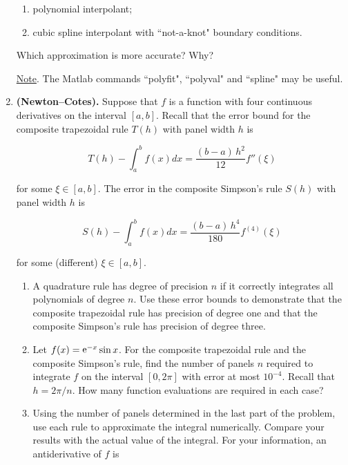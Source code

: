 \documentclass [12pt]{article}
\begin{document}
\begin{enumerate}
\begin{enumerate}
\item polynomial interpolant;

\item cubic spline interpolant with ``not-a-knot" boundary conditions.

\end{enumerate}
Which approximation is more accurate? Why?

\underline{Note}. The Matlab commands ``polyfit", ``polyval" and
``spline" may be useful.

\item   \textbf{(Newton--Cotes).}  Suppose that $f$ is a function with four continuous derivatives on the interval $[a, b]$.  Recall that the error bound for the composite trapezoidal rule $T(h)$ with panel width $h$ is

$$
T(h) - \int_a^b f(x) dx = \frac{(b - a)\, h^2}{12} f''(\xi)
$$ 

for some $\xi \in [a, b]$.  The error in the composite Simpson's rule $S(h)$ with panel width $h$ is

$$
S(h) - \int_a^b f(x) dx = \frac{(b - a)\, h^4}{180} f^{(4)}(\xi)
$$

for some (different) $\xi \in [a, b]$.



\vspace{1pc}



\begin{enumerate}

\item  A quadrature rule has degree of precision $n$ if it correctly integrates all polynomials of degree $n$.  Use these error bounds to demonstrate that the composite trapezoidal rule has precision of degree one and that the composite Simpson's rule has precision of degree three.



\item   Let $f(x) = \mathop{\rm e}\nolimits^{-x} \sin x$.  For the composite trapezoidal rule and the composite Simpson's rule, find the number of panels $n$ required to integrate $f$ on the interval $[0, 2\pi]$ with error at most $10^{-4}$.  Recall that $h = 2\pi/n$.  How many function evaluations are required in each case?


\item   Using the number of panels determined in the last part of the problem, use each rule to approximate the integral numerically.  Compare your results with the actual value of the integral.  For your information, an antiderivative of $f$ is


\end{enumerate}
\end{enumerate}
\end{document}
